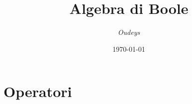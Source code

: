 \documentclass[a4paper,12pt]{article}
\title{\textbf{Algebra di Boole}}
\author{\textit{Oudeys}}
\date{\today}
\theoremstyle{mystyle}
\begin{document}
\maketitle



\tableofcontents
\newpage

\section{Operatori}
\end{document}
